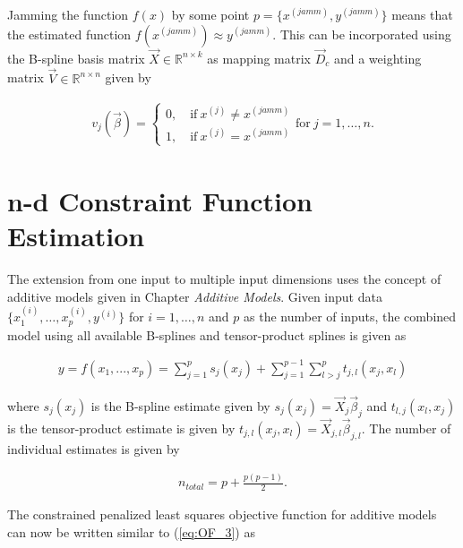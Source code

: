 \documentclass[10pt,a4paper]{report}
\begin{document}
Jamming the function $f(x)$ by some point $p = \{x^{(jamm)}, y^{(jamm)}\}$ means that the estimated function $f(x^{(jamm)}) \approx y^{(jamm)}$. This can be incorporated using the B-spline basis matrix $\vec{X} \in \mathbb{R}^{n \times k}$ as mapping matrix $\vec{D}_c$ and a weighting matrix $\vec{V} \in \mathbb{R}^{n \times n}$ given by

\begin{align} \label{eq:v_jamming}
	v_j(\vec{\beta}) = 
		\begin{cases}
			0, \quad \text{if} \ x^{(j)} \ne x^{(jamm)} \\
			1, \quad \text{if} \ x^{(j)} = x^{(jamm)} 
	\end{cases} \text{for} \ j = 1, \dots, n.
\end{align} 


\section{n-d Constraint Function Estimation}

The extension from one input to multiple input dimensions uses the concept of additive models given in Chapter \emph{Additive Models}. Given input data $\{ x_1^{(i)}, \dots, x_p^{(i)}, y^{(i)}\}$ for $i = 1, \dots, n$ and $p$ as the number of inputs, the combined model using all available B-splines and tensor-product splines is given as

\begin{align} \label{eq:tps_all}
	y = f(x_1,..., x_p) = \sum_{j=1}^p s_j(x_j) + \sum_{j=1}^{p-1} \sum_{l>j}^p t_{j, l}(x_j, x_l)
\end{align}

where $s_j(x_j)$ is the B-spline estimate given by $s_j(x_j) = \vec{X}_j \vec{\beta}_j$ and $t_{l, j}(x_l,x_j)$ is the tensor-product estimate is given by $t_{j, l}(x_j,x_l) = \vec{X}_{j, l} \vec{\beta}_{j, l}$. The number of individual estimates is given by 

\begin{align}
	n_{total} = p + \frac{p(p-1)}{2}.  
\end{align}


The constrained penalized least squares objective function for additive models can now be written similar to (\ref{eq:OF_3}) as
\end{document}
